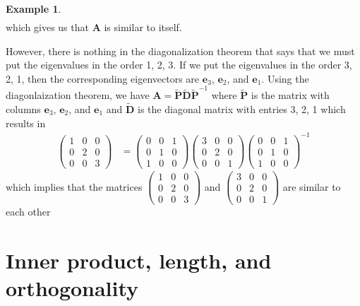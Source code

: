 \documentclass[
]{book}
\theoremstyle{definition}
\theoremstyle{definition}
\newtheorem{example}{Example}[chapter]
\theoremstyle{definition}
\theoremstyle{definition}
\theoremstyle{remark}
\begin{document}
\begin{example}
\[\begin{aligned}
\end{aligned}
\]
which gives us that \(\mathbf{A}\) is similar to itself.

However, there is nothing in the diagonalization theorem that says that we must put the eigenvalues in the order 1, 2, 3. If we put the eigenvalues in the order 3, 2, 1, then the corresponding eigenvectors are \(\mathbf{e}_3\), \(\mathbf{e}_2\), and \(\mathbf{e}_1\). Using the diagonlaization theorem, we have \(\mathbf{A} = \tilde{\mathbf{P}} \tilde{\mathbf{D}} \tilde{\mathbf{P}}^{-1}\) where \(\tilde{\mathbf{P}}\) is the matrix with columns \(\mathbf{e}_3\), \(\mathbf{e}_2\), and \(\mathbf{e}_1\) and \(\tilde{\mathbf{D}}\) is the diagonal matrix with entries 3, 2, 1 which results in
\[
\begin{aligned}
\begin{pmatrix} 1 & 0 & 0 \\ 0 & 2 & 0 \\ 0 & 0 & 3 \end{pmatrix} & = \begin{pmatrix} 0 & 0 & 1 \\ 0 & 1 & 0 \\ 1 & 0 & 0 \end{pmatrix} \begin{pmatrix} 3 & 0 & 0 \\ 0 & 2 & 0 \\ 0 & 0 & 1 \end{pmatrix} \begin{pmatrix} 0 & 0 & 1 \\ 0 & 1 & 0 \\ 1 & 0 & 0 \end{pmatrix}^{-1}
\end{aligned}
\]
which implies that the matrices \(\begin{pmatrix} 1 & 0 & 0 \\ 0 & 2 & 0 \\ 0 & 0 & 3 \end{pmatrix}\) and \(\begin{pmatrix} 3 & 0 & 0 \\ 0 & 2 & 0 \\ 0 & 0 & 1 \end{pmatrix}\) are similar to each other
\end{example}

\hypertarget{inner-product-length-and-orthogonality}{%
\chapter{Inner product, length, and orthogonality}\label{inner-product-length-and-orthogonality}}
\end{document}
